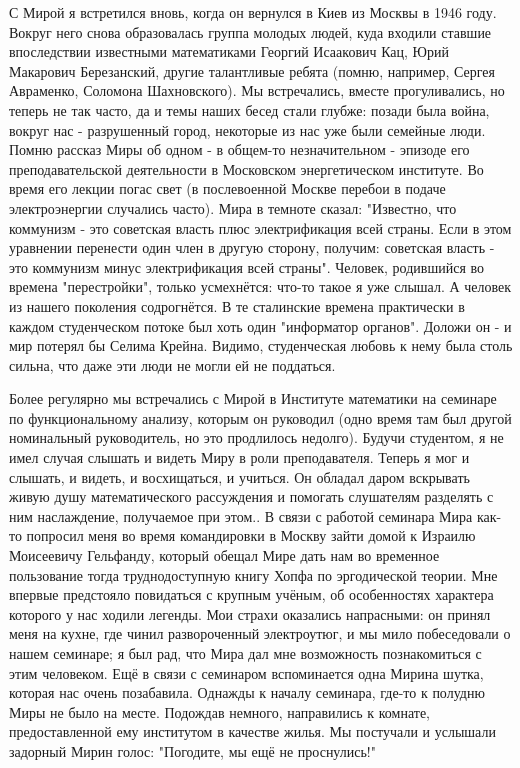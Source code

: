 С Мирой я встретился вновь, когда он вернулся в Киев из Москвы в 1946 году. Вокруг него снова образовалась группа молодых людей, куда входили ставшие впоследствии известными математиками Георгий Исаакович Кац, Юрий Макарович Березанский, другие талантливые ребята (помню, например, Сергея Авраменко, Соломона Шахновского). Мы встречались, вместе прогуливались, но теперь не так часто, да и темы наших бесед стали глубже: позади была война, вокруг нас - разрушенный город, некоторые из нас уже были семейные люди. Помню рассказ Миры об одном - в общем-то незначительном - эпизоде его преподавательской деятельности в Московском энергетическом институте. Во время его лекции погас свет (в послевоенной Москве перебои в подаче электроэнергии случались часто). Мира в темноте сказал: "Известно, что коммунизм - это советская власть плюс электрификация всей страны. Если в этом уравнении перенести один член в другую сторону, получим: советская власть - это коммунизм минус электрификация всей страны". Человек, родившийся во времена "перестройки", только усмехнётся: что-то такое я уже слышал. А человек из нашего поколения содрогнётся. В те сталинские времена практически в каждом студенческом потоке был хоть один "информатор органов". Доложи он - и мир потерял бы Селима Крейна. Видимо, студенческая любовь к нему была столь сильна, что даже эти люди не могли ей не поддаться.

Более регулярно мы встречались с Мирой в Институте математики на семинаре по функциональному анализу, которым он руководил (одно время там был другой номинальный руководитель, но это продлилось недолго). Будучи студентом, я не имел случая слышать и видеть Миру в роли преподавателя. Теперь я мог и слышать, и видеть, и восхищаться, и учиться. Он обладал даром вскрывать живую душу математического рассуждения и помогать слушателям разделять с ним наслаждение, получаемое при этом.. В связи с работой семинара Мира как-то попросил меня во время командировки в Москву зайти домой к Израилю Моисеевичу Гельфанду, который обещал Мире дать нам во временное пользование тогда труднодоступную книгу Хопфа по эргодической теории. Мне впервые предстояло повидаться с крупным учёным, об особенностях характера которого у нас ходили легенды. Мои страхи оказались напрасными: он принял меня на кухне, где чинил развороченный электроутюг, и мы мило побеседовали о нашем семинаре; я был рад, что Мира дал мне возможность познакомиться с этим человеком. Ещё в связи с семинаром вспоминается одна Мирина шутка, которая нас очень позабавила. Однажды к началу семинара, где-то к полудню Миры не было на месте. Подождав немного, направились к комнате, предоставленной ему институтом в качестве жилья. Мы постучали и услышали задорный Мирин голос: "Погодите, мы ещё не проснулись!"

